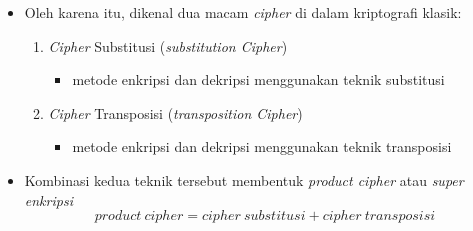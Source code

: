 \documentclass{article}
\begin{document}

\begin{itemize}
  \item Oleh karena itu, dikenal dua macam \textit{cipher} di dalam kriptografi klasik:
  \begin{enumerate}
    \item \textit{Cipher} Substitusi (\textit{substitution Cipher})
    \begin{itemize}
      \item metode enkripsi dan dekripsi menggunakan teknik substitusi
    \end{itemize}
    \item \textit{Cipher} Transposisi (\textit{transposition Cipher})
    \begin{itemize}
      \item metode enkripsi dan dekripsi menggunakan teknik transposisi
    \end{itemize}
  \end{enumerate}
  \item Kombinasi kedua teknik tersebut membentuk \textit{product cipher} atau \textit{super enkripsi}
  \[ 
    product\ cipher = cipher\ substitusi + cipher\ transposisi
  \]
\end{itemize}
\end{document}
